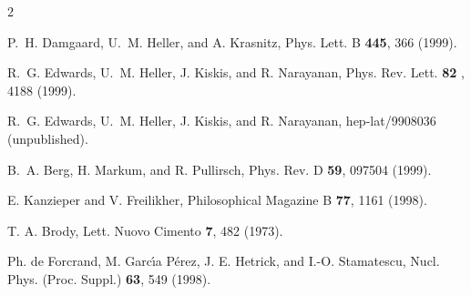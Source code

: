 \begin{multicols}{2}
\begin{references}
P.~H. Damgaard, U.~M. Heller, and A. Krasnitz, Phys. Lett. B {\bf 445},  366
  (1999).

R.~G. Edwards, U.~M. Heller, J. Kiskis, and R. Narayanan, Phys. Rev. Lett.
{\bf 82} , 4188 (1999).

R.~G. Edwards, U.~M. Heller, J. Kiskis, and R. Narayanan,
hep-lat/9908036 (unpublished).

B.~A. Berg, H. Markum, and R. Pullirsch, Phys. Rev. D {\bf 59}, 097504 (1999).


E. Kanzieper and V. Freilikher, Philosophical Magazine B {\bf 77},  1161
  (1998).
  
T. A. Brody, Lett. Nuovo Cimento {\bf 7}, 482 (1973).

Ph. de Forcrand, M. Garc\'{\i}a P\'erez, J. E. Hetrick, and I.-O. Stamatescu,
Nucl. Phys. (Proc. Suppl.) {\bf 63}, 549 (1998).

\end{references}
\end{multicols}


